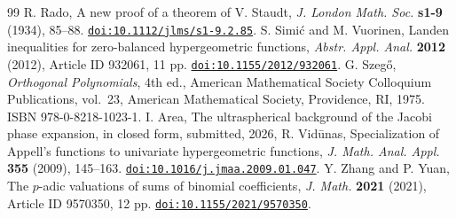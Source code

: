 \documentclass[10pt,a4paper]{amsart}
\newcommand{\doi}[1]{\href{https://doi.org/#1}{\nolinkurl{doi:#1}}}
\begin{document}
\begin{thebibliography}{99}
 R. Rado, A new proof of a theorem of V. Staudt, \emph{J. London Math. Soc.} \textbf{s1-9} (1934), 85--88. \doi{10.1112/jlms/s1-9.2.85}.
 S. Simi\'c and M. Vuorinen, Landen inequalities for zero-balanced hypergeometric functions, \emph{Abstr. Appl. Anal.} \textbf{2012} (2012), Article ID 932061, 11 pp. \doi{10.1155/2012/932061}.
 G. Szeg\H{o}, \emph{Orthogonal Polynomials}, 4th ed., American Mathematical Society Colloquium Publications, vol.~23, American Mathematical Society, Providence, RI, 1975. ISBN 978-0-8218-1023-1.
 I. Area, The ultraspherical background of the Jacobi phase expansion, in closed form, submitted, 2026, %
 R. Vid\=unas, Specialization of Appell's functions to univariate hypergeometric functions, \emph{J. Math. Anal. Appl.} \textbf{355} (2009), 145--163. \doi{10.1016/j.jmaa.2009.01.047}.
 Y. Zhang and P. Yuan, The $p$-adic valuations of sums of binomial coefficients, \emph{J. Math.} \textbf{2021} (2021), Article ID 9570350, 12 pp. \doi{10.1155/2021/9570350}.
\end{thebibliography}
\end{document}
